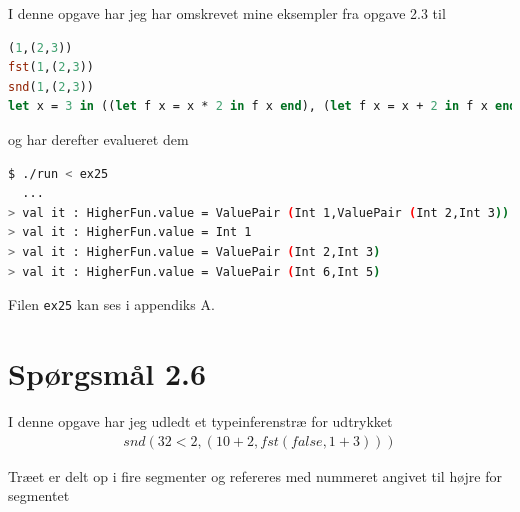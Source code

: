 \documentclass[danish,a4paper]{report}
\begin{document}
I denne opgave har jeg har omskrevet mine eksempler fra opgave 2.3 til

\begin{lstlisting}[language=ML]
(1,(2,3))
fst(1,(2,3))
snd(1,(2,3))
let x = 3 in ((let f x = x * 2 in f x end), (let f x = x + 2 in f x end)) end
\end{lstlisting}

og har derefter evalueret dem

\begin{lstlisting}[language=bash]
$ ./run < ex25
  ...
> val it : HigherFun.value = ValuePair (Int 1,ValuePair (Int 2,Int 3))
> val it : HigherFun.value = Int 1
> val it : HigherFun.value = ValuePair (Int 2,Int 3)
> val it : HigherFun.value = ValuePair (Int 6,Int 5)
\end{lstlisting}

Filen \texttt{ex25} kan ses i appendiks A.

\section*{Spørgsmål 2.6}

I denne opgave har jeg udledt et typeinferenstræ for udtrykket 
\begin{align*}
snd(32 < 2, (10 + 2,fst(false,1+3)))
\end{align*}

Træet er delt op i fire segmenter og refereres med nummeret angivet til højre for segmentet
\end{document}
